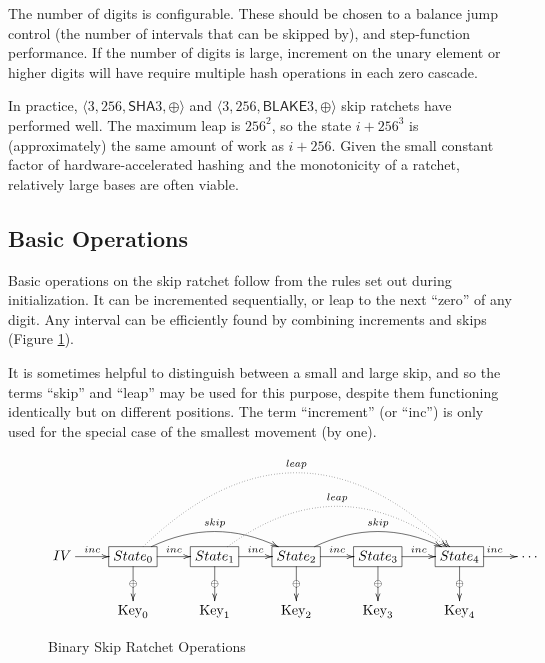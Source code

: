 \documentclass{article}
\begin{document}
	The number of digits is configurable. These should be chosen to a balance jump control (the number of intervals that can be skipped by), and step-function performance. If the number of digits is large, increment on the unary element or higher digits will have require multiple hash operations in each zero cascade.
	
	In practice, $\langle 3, 256, \textsf{SHA}3, \oplus \rangle$ and $\langle 3, 256, \textsf{BLAKE}3, \oplus \rangle$ skip ratchets have performed well. The maximum leap is $256^{2}$, so the state $i + 256^{3}$ is (approximately) the same amount of work as $i + 256$. Given the small constant factor of hardware-accelerated hashing and the monotonicity of a ratchet, relatively large bases are often viable.

	\subsection{Basic Operations}
	
	Basic operations on the skip ratchet follow from the rules set out during initialization. It can be incremented sequentially, or leap to the next ``zero'' of any digit. Any interval can be efficiently found by combining increments and skips (Figure \ref{fig:sr-ops}).
	
	It is sometimes helpful to distinguish between a small and large skip, and so the terms ``skip'' and ``leap'' may be used for this purpose, despite them functioning identically but on different positions. The term ``increment'' (or ``inc'') is only used for the special case of the smallest movement (by one).
	
	\begin{figure}[h]
		\centering
		
		$\xymatrix{
			IV \ar[r]^<<<<<{inc} 
				& *+[F]{State_{0}}
					\ar[d]|\oplus
					\ar[r]^{inc}
					\ar@/^1.5pc/[rr]^{skip}
					\ar@{.>}@/^5pc/[rrrr]^{leap}
				& *+[F]{State_{1}}
					\ar[d]|\oplus
					\ar[r]^{inc}
					\ar@{.>}@/^3pc/[rrr]^{leap}
				& *+[F]{State_{2}} 
					\ar[d]|\oplus
					\ar[r]^{inc}
					\ar@/^1.5pc/[rr]^{skip}
				& *+[F]{State_{3}}
					\ar[d]|\oplus
					\ar[r]^{inc}
				& *+[F]{State_{4}}
					\ar[d]|\oplus
					\ar[r]^{inc}
				& \cdots
			\\
				& \text{Key}_{0}
				& \text{Key}_{1}
				& \text{Key}_{2}
				& \text{Key}_{3}
				& \text{Key}_{4}
		}$
		
		\caption{Binary Skip Ratchet Operations}
		\label{fig:sr-ops}
	\end{figure}
\end{document}
